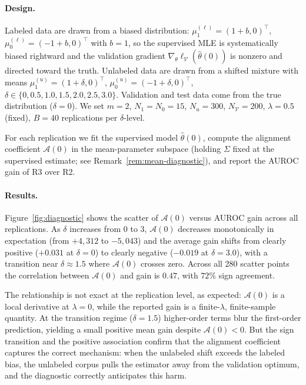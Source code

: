 \documentclass[11pt]{article}
\theoremstyle{definition}
\newcommand{\lam}{\lambda}
\newcommand{\Sig}{\Sigma}
\newcommand{\calV}{\mathcal{V}}
\newcommand{\calA}{\mathcal{A}}
\begin{document}
\paragraph{Design.}
Labeled data are drawn from a biased distribution:
\(\mu_1^{(\ell)}=(1+b,0)^\top\), \(\mu_0^{(\ell)}=(-1+b,0)^\top\)
with \(b=1\), so the supervised MLE is systematically biased rightward
and the validation gradient \(\nabla_\theta\ell_{\calV}(\hat\theta(0))\) is
nonzero and directed toward the truth.
Unlabeled data are drawn from a shifted mixture with means
\(\mu_1^{(u)}=(1+\delta,0)^\top\), \(\mu_0^{(u)}=(-1+\delta,0)^\top\),
\(\delta\in\{0,0.5,1.0,1.5,2.0,2.5,3.0\}\).
Validation and test data come from the true distribution (\(\delta=0\)).
We set \(m=2\), \(N_1=N_0=15\), \(N_u=300\), \(N_{\mathcal{V}}=200\),
\(\lam=0.5\) (fixed), \(B=40\) replications per \(\delta\)-level.

For each replication we fit the supervised model \(\hat\theta(0)\),
compute the alignment coefficient \(\calA(0)\) in the mean-parameter
subspace (holding \(\Sig\) fixed at the supervised estimate; see
Remark~\ref{rem:mean-diagnostic}), and report the AUROC gain of R3 over R2.

\paragraph{Results.}
Figure~\ref{fig:diagnostic} shows the scatter of \(\calA(0)\) versus AUROC
gain across all replications.
As \(\delta\) increases from 0 to 3, \(\calA(0)\) decreases monotonically
in expectation (from \(+4{,}312\) to \(-5{,}043\)) and the average gain
shifts from clearly positive (\(+0.031\) at \(\delta=0\)) to clearly negative
(\(-0.019\) at \(\delta=3.0\)), with a transition near \(\delta\approx1.5\)
where \(\calA(0)\) crosses zero.
Across all 280 scatter points the correlation between \(\calA(0)\) and gain
is \(0.47\), with \(72\%\) sign agreement.

The relationship is not exact at the replication level, as expected:
\(\calA(0)\) is a local derivative at \(\lam=0\), while the reported gain
is a finite-\(\lam\), finite-sample quantity.
At the transition regime (\(\delta=1.5\)) higher-order terms blur
the first-order prediction, yielding a small positive mean gain despite
\(\calA(0)<0\).
But the sign transition and the positive association confirm that the
alignment coefficient captures the correct mechanism: when the unlabeled shift
exceeds the labeled bias, the unlabeled corpus pulls the estimator away from
the validation optimum, and the diagnostic correctly anticipates this harm.
\end{document}
